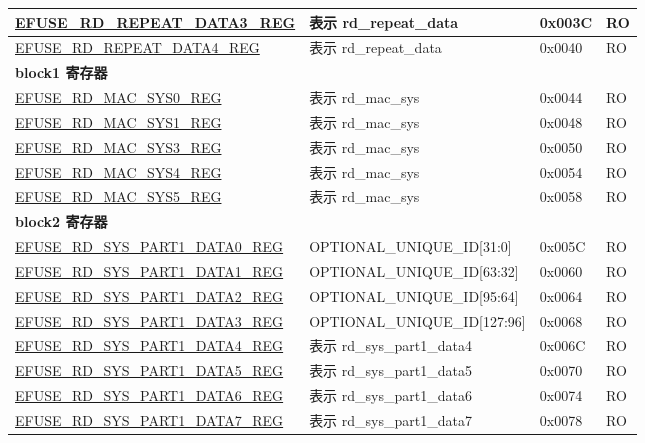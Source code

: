\begin{longtable}{ | p{7cm} | p{6cm} | p{1.2cm} | p{1.5cm} | }
\hyperref[regdesc:EFUSERDREPEATDATA3REG]{EFUSE\_RD\_REPEAT\_DATA3\_REG} & 表示 rd\_repeat\_data & 0x003C & RO \\ \hline
\hyperref[regdesc:EFUSERDREPEATDATA4REG]{EFUSE\_RD\_REPEAT\_DATA4\_REG} & 表示 rd\_repeat\_data & 0x0040 & RO \\ \hline
\multicolumn{4}{|l|}{\textbf{block1 寄存器}} \\ \hline
\hyperref[regdesc:EFUSERDMACSYS0REG]{EFUSE\_RD\_MAC\_SYS0\_REG} & 表示 rd\_mac\_sys & 0x0044 & RO \\ \hline
\hyperref[regdesc:EFUSERDMACSYS1REG]{EFUSE\_RD\_MAC\_SYS1\_REG} & 表示 rd\_mac\_sys & 0x0048 & RO \\ \hline
\hyperref[regdesc:EFUSERDMACSYS3REG]{EFUSE\_RD\_MAC\_SYS3\_REG} & 表示 rd\_mac\_sys & 0x0050 & RO \\ \hline
\hyperref[regdesc:EFUSERDMACSYS4REG]{EFUSE\_RD\_MAC\_SYS4\_REG} & 表示 rd\_mac\_sys & 0x0054 & RO \\ \hline
\hyperref[regdesc:EFUSERDMACSYS5REG]{EFUSE\_RD\_MAC\_SYS5\_REG} & 表示 rd\_mac\_sys & 0x0058 & RO \\ \hline
\multicolumn{4}{|l|}{\textbf{block2 寄存器}} \\ \hline
\hyperref[regdesc:EFUSERDSYSPART1DATA0REG]{EFUSE\_RD\_SYS\_PART1\_DATA0\_REG} & OPTIONAL\_UNIQUE\_ID[31:0] & 0x005C & RO \\ \hline
\hyperref[regdesc:EFUSERDSYSPART1DATA1REG]{EFUSE\_RD\_SYS\_PART1\_DATA1\_REG} & OPTIONAL\_UNIQUE\_ID[63:32] & 0x0060 & RO \\ \hline
\hyperref[regdesc:EFUSERDSYSPART1DATA2REG]{EFUSE\_RD\_SYS\_PART1\_DATA2\_REG} & OPTIONAL\_UNIQUE\_ID[95:64] & 0x0064 & RO \\ \hline
\hyperref[regdesc:EFUSERDSYSPART1DATA3REG]{EFUSE\_RD\_SYS\_PART1\_DATA3\_REG} & OPTIONAL\_UNIQUE\_ID[127:96] & 0x0068 & RO \\ \hline
\hyperref[regdesc:EFUSERDSYSPART1DATA4TO7REG]{EFUSE\_RD\_SYS\_PART1\_DATA4\_REG} & 表示 rd\_sys\_part1\_data4 & 0x006C & RO \\ \hline
\hyperref[regdesc:EFUSERDSYSPART1DATA4TO7REG]{EFUSE\_RD\_SYS\_PART1\_DATA5\_REG} & 表示 rd\_sys\_part1\_data5 & 0x0070 & RO \\ \hline
\hyperref[regdesc:EFUSERDSYSPART1DATA4TO7REG]{EFUSE\_RD\_SYS\_PART1\_DATA6\_REG} & 表示 rd\_sys\_part1\_data6 & 0x0074 & RO \\ \hline
\hyperref[regdesc:EFUSERDSYSPART1DATA4TO7REG]{EFUSE\_RD\_SYS\_PART1\_DATA7\_REG} & 表示 rd\_sys\_part1\_data7 & 0x0078 & RO \\ \hline

\end{longtable}
